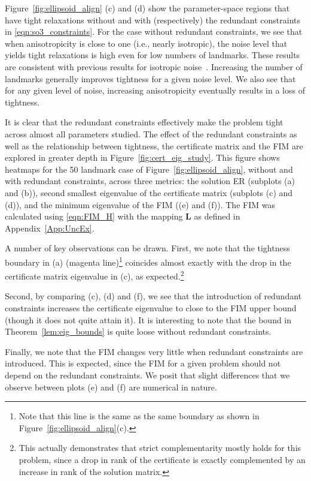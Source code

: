 \documentclass[lettersize,journal]{IEEEtran}
\begin{document}
Figure~\ref{fig:ellipsoid_align} (c) and (d) show the parameter-space regions that have tight relaxations without and with (respectively) the redundant constraints in \eqref{eqn:so3_constraints}. For the case without redundant constraints, we see that when anisotropicity is close to one (i.e., nearly isotropic), the noise level that yields tight relaxations is high even for low numbers of landmarks. These results are consistent with previous results for isotropic noise~\cite{holmesEfficientGlobalOptimality2023}. Increasing the number of landmarks generally improves tightness for a given noise level. We also see that for any given level of noise, increasing anisotropicity eventually results in a loss of tightness. 

It is clear that the redundant constraints effectively make the problem tight across almost all parameters studied. The effect of the redundant constraints as well as the relationship between tightness, the certificate matrix and the FIM are explored in greater depth in Figure~\ref{fig:cert_eig_study}. This figure shows heatmaps for the 50 landmark case of Figure~\ref{fig:ellipsoid_align}, without and with redundant constraints, across three metrics: the solution ER (subplots (a) and (b)), second smallest eigenvalue of the certificate matrix (subplots (c) and (d)), and the minimum eigenvalue of the FIM ((e) and (f)). The FIM was calculated using \eqref{eqn:FIM_H} with the mapping $\bm{L}$ as defined in  Appendix~\ref{App:UncEx}. 

A number of key observations can be drawn. First, we note that the tightness boundary in (a) (magenta line)\footnote{Note that this line is the same as the same boundary as shown in Figure~\ref{fig:ellipsoid_align}(c).} coincides almost exactly with the drop in the certificate matrix eigenvalue in (c), as expected.\footnote{This actually demonstrates that strict complementarity mostly holds for this problem, since a drop in rank of the certificate is exactly complemented by an increase in rank of the solution matrix.} 

Second, by comparing (c), (d) and (f), we see that the introduction of redundant constraints increases the certificate eigenvalue to close to the FIM upper bound (though it does not quite attain it). It is interesting to note that the bound in Theorem~\ref{lem:eig_bounds} is quite loose without redundant constraints. 

Finally, we note that the FIM changes very little when redundant constraints are introduced. This is expected, since the FIM for a given problem should not depend on the redundant constraints. We posit that slight differences that we observe between plots (e) and (f) are numerical in nature. 
\end{document}
